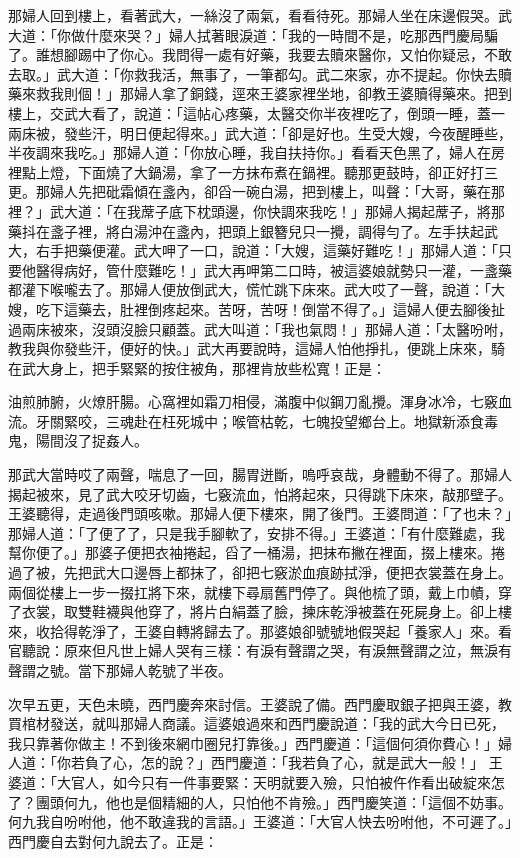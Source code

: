\begin{showcontents}{}
那婦人回到樓上，看著武大，一絲沒了兩氣，看看待死。那婦人坐在床邊假哭。武大道：「你做什麼來哭？」婦人拭著眼淚道：「我的一時間不是，吃那西門慶局騙了。誰想腳踢中了你心。我問得一處有好藥，我要去贖來醫你，又怕你疑忌，不敢去取。」武大道：「你救我活，無事了，一筆都勾。武二來家，亦不提起。你快去贖藥來救我則個！」那婦人拿了銅錢，逕來王婆家裡坐地，卻教王婆贖得藥來。把到樓上，交武大看了，說道：「這帖心疼藥，太醫交你半夜裡吃了，倒頭一睡，蓋一兩床被，發些汗，明日便起得來。」武大道：「卻是好也。生受大嫂，今夜醒睡些，半夜調來我吃。」那婦人道：「你放心睡，我自扶持你。」看看天色黑了，婦人在房裡點上燈，下面燒了大鍋湯，拿了一方抹布煮在鍋裡。聽那更鼓時，卻正好打三更。那婦人先把砒霜傾在盞內，卻舀一碗白湯，把到樓上，叫聲：「大哥，藥在那裡？」武大道：「在我蓆子底下枕頭邊，你快調來我吃！」那婦人揭起蓆子，將那藥抖在盞子裡，將白湯沖在盞內，把頭上銀簪兒只一攪，調得勻了。左手扶起武大，右手把藥便灌。武大呷了一口，說道：「大嫂，這藥好難吃！」那婦人道：「只要他醫得病好，管什麼難吃！」武大再呷第二口時，被這婆娘就勢只一灌，一盞藥都灌下喉嚨去了。那婦人便放倒武大，慌忙跳下床來。武大哎了一聲，說道：「大嫂，吃下這藥去，肚裡倒疼起來。苦呀，苦呀！倒當不得了。」這婦人便去腳後扯過兩床被來，沒頭沒臉只顧蓋。武大叫道：「我也氣悶！」那婦人道：「太醫吩咐，教我與你發些汗，便好的快。」武大再要說時，這婦人怕他掙扎，便跳上床來，騎在武大身上，把手緊緊的按住被角，那裡肯放些松寬！正是：

油煎肺腑，火燎肝腸。心窩裡如霜刀相侵，滿腹中似鋼刀亂攪。渾身冰冷，七竅血流。牙關緊咬，三魂赴在枉死城中；喉管枯乾，七魄投望鄉台上。地獄新添食毒鬼，陽間沒了捉姦人。

那武大當時哎了兩聲，喘息了一回，腸胃迸斷，嗚呼哀哉，身體動不得了。那婦人揭起被來，見了武大咬牙切齒，七竅流血，怕將起來，只得跳下床來，敲那壁子。王婆聽得，走過後門頭咳嗽。那婦人便下樓來，開了後門。王婆問道：「了也未？」那婦人道：「了便了了，只是我手腳軟了，安排不得。」王婆道：「有什麼難處，我幫你便了。」那婆子便把衣袖捲起，舀了一桶湯，把抹布撇在裡面，掇上樓來。捲過了被，先把武大口邊唇上都抹了，卻把七竅淤血痕跡拭淨，便把衣裳蓋在身上。兩個從樓上一步一掇扛將下來，就樓下尋扇舊門停了。與他梳了頭，戴上巾幘，穿了衣裳，取雙鞋襪與他穿了，將片白絹蓋了臉，揀床乾淨被蓋在死屍身上。卻上樓來，收拾得乾淨了，王婆自轉將歸去了。那婆娘卻號號地假哭起「養家人」來。看官聽說：原來但凡世上婦人哭有三樣：有淚有聲謂之哭，有淚無聲謂之泣，無淚有聲謂之號。當下那婦人乾號了半夜。

次早五更，天色未曉，西門慶奔來討信。王婆說了備。西門慶取銀子把與王婆，教買棺材發送，就叫那婦人商議。這婆娘過來和西門慶說道：「我的武大今日已死，我只靠著你做主！不到後來網巾圈兒打靠後。」西門慶道：「這個何須你費心！」婦人道：「你若負了心，怎的說？」西門慶道：「我若負了心，就是武大一般！」 王婆道：「大官人，如今只有一件事要緊：天明就要入殮，只怕被仵作看出破綻來怎了？團頭何九，他也是個精細的人，只怕他不肯殮。」西門慶笑道：「這個不妨事。何九我自吩咐他，他不敢違我的言語。」王婆道：「大官人快去吩咐他，不可遲了。」西門慶自去對何九說去了。正是：


\end{showcontents}
